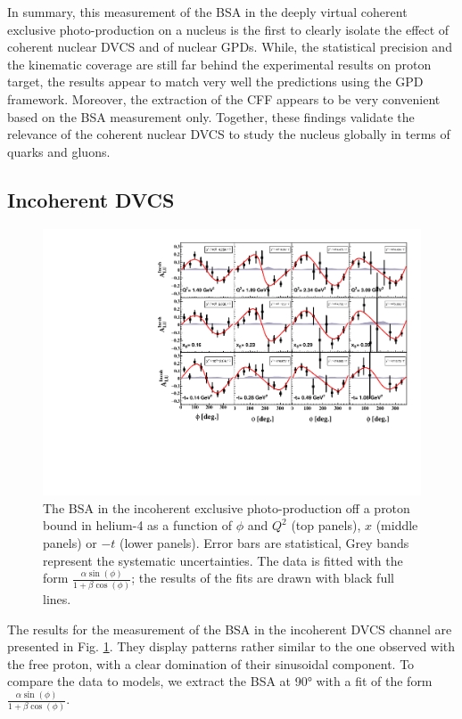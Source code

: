 \documentclass{article}
\begin{document}
In summary, this measurement of the BSA in the deeply virtual coherent exclusive 
photo-production on a nucleus is the first to clearly isolate the effect of 
coherent nuclear DVCS and of nuclear GPDs. While, the statistical precision and 
the kinematic coverage are still far behind the experimental results on
proton target, the results appear to match very well the predictions using the GPD 
framework. Moreover, the extraction of the CFF appears to be very convenient based
on the BSA measurement only. Together, these findings  validate the relevance of the 
coherent nuclear DVCS to study the nucleus globally in terms of quarks and 
gluons. 

\subsection{Incoherent DVCS}

\begin{figure}[bp!]
\center
\includegraphics[width=15cm]{fig3/incoherent_ALU_phi.pdf}
	\caption{The BSA in the incoherent exclusive photo-production off a proton bound in
	helium-4 as a function of $\phi$ and $Q^2$ 
	(top panels), $x$ (middle panels) or $-t$ (lower panels). Error bars are  
	statistical, Grey bands represent the systematic uncertainties. The data is fitted with the 
	form $\frac{\alpha \sin(\phi)}{1+\beta \cos(\phi)}$; the results of the 
	fits are drawn with black full lines.}
\label{fig:InCohALUphi}
\end{figure}

The results for the measurement of the BSA in the incoherent DVCS channel are presented in
Fig. \ref{fig:InCohALUphi}. They display patterns rather similar to the one observed with the 
free proton, with a clear domination of their sinusoidal component. To compare the data to 
models, we extract the BSA at 90° with a fit of the form $\frac{\alpha \sin(\phi)}{1+\beta \cos(\phi)}$. 
\end{document}
